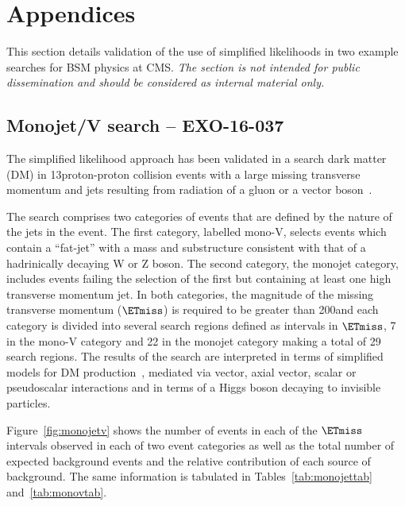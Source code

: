 \section{Appendices}

This section details validation of the use of simplified likelihoods in two example searches for BSM physics at CMS. 
\emph{The section is not intended for public dissemination and should be considered as internal material only.}

\subsection{Monojet/V search -- EXO-16-037}

The simplified likelihood approach has been validated in a search dark matter (DM) in  
13\TeV proton-proton collision events with a large missing transverse momentum and jets resulting from radiation 
of a gluon or a vector boson~\cite{}.

The search comprises two categories of events that are defined by the nature of the jets in the event. 
The first category, labelled mono-V, selects events which contain a ``fat-jet'' with a mass and substructure 
consistent with that of a hadrinically decaying W or Z boson. The second category, the monojet category, 
includes events failing the selection of the first but containing at least one high transverse momentum jet. 
In both categories, the magnitude of the missing transverse momentum ($\ETmiss$) is required to be greater than 200\GeV and 
each category is divided into several search regions defined as intervals in $\ETmiss$, 7 in the mono-V category and 22 in the 
monojet category making a total of 29 search regions.  The results of the search are interpreted 
in terms of simplified models for DM production~\cite{}, mediated via vector, axial vector, scalar or pseudoscalar interactions and 
in terms of a Higgs boson decaying to invisible particles. 

Figure~\ref{fig:monojetv} shows the number of events in each of the $\ETmiss$ intervals observed in each of two event 
categories as well as the total number of expected background events and the relative contribution of each source of background. The same information 
is tabulated in Tables~\ref{tab:monojettab} and~\ref{tab:monovtab}. 


